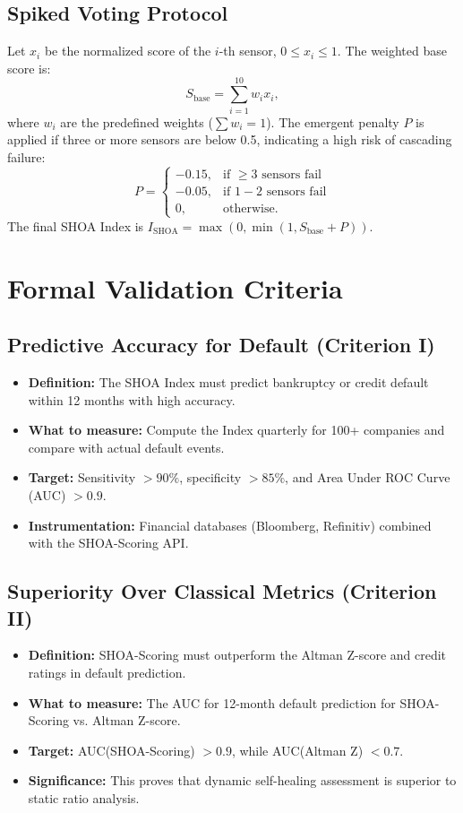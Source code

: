 \documentclass[12pt]{article}
\begin{document}
\subsection{Spiked Voting Protocol}
Let $x_i$ be the normalized score of the $i$-th sensor, $0 \le x_i \le 1$. The weighted base score is:
\begin{equation}
S_{\text{base}} = \sum_{i=1}^{10} w_i x_i,
\end{equation}
where $w_i$ are the predefined weights ($\sum w_i = 1$). The emergent penalty $P$ is applied if three or more sensors are below 0.5, indicating a high risk of cascading failure:
\begin{equation}
P = 
\begin{cases}
-0.15, & \text{if } \ge 3 \text{ sensors fail} \\
-0.05, & \text{if } 1-2 \text{ sensors fail} \\
0, & \text{otherwise}.
\end{cases}
\end{equation}
The final SHOA Index is $I_{\text{SHOA}} = \max(0, \min(1, S_{\text{base}} + P))$.

\section{Formal Validation Criteria}

\subsection{Predictive Accuracy for Default (Criterion I)}
\begin{itemize}
    \item \textbf{Definition:} The SHOA Index must predict bankruptcy or credit default within 12 months with high accuracy.
    \item \textbf{What to measure:} Compute the Index quarterly for 100+ companies and compare with actual default events.
    \item \textbf{Target:} Sensitivity $> 90\%$, specificity $> 85\%$, and Area Under ROC Curve (AUC) $> 0.9$.
    \item \textbf{Instrumentation:} Financial databases (Bloomberg, Refinitiv) combined with the SHOA-Scoring API.
\end{itemize}

\subsection{Superiority Over Classical Metrics (Criterion II)}
\begin{itemize}
    \item \textbf{Definition:} SHOA-Scoring must outperform the Altman Z-score and credit ratings in default prediction.
    \item \textbf{What to measure:} The AUC for 12-month default prediction for SHOA-Scoring vs. Altman Z-score.
    \item \textbf{Target:} AUC(SHOA-Scoring) $> 0.9$, while AUC(Altman Z) $< 0.7$.
    \item \textbf{Significance:} This proves that dynamic self-healing assessment is superior to static ratio analysis.
\end{itemize}
\end{document}
